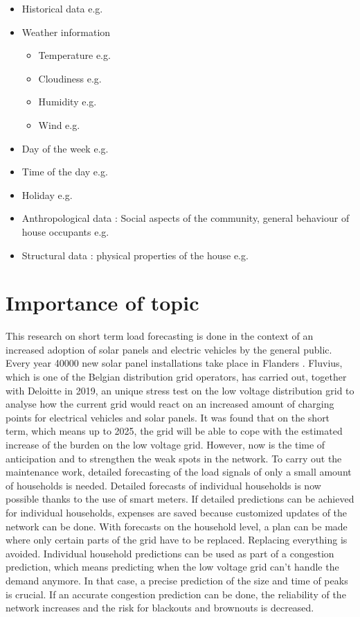 \begin{itemize}
	\item Historical data e.g. \cite{Kong2019}
	\item Weather information
	\begin{itemize}
		\item Temperature e.g. \cite{Kong2019}
		\item Cloudiness e.g. \cite{Contaxi2006}
		\item Humidity e.g. \cite{Contaxi2006}
		\item Wind e.g. \cite{Charytoniuk1997}
	\end{itemize}
	\item Day of the week e.g. \cite{Kong2019}
	\item Time of the day e.g. \cite{Kong2019}
	\item Holiday e.g. \cite{Kong2019}
	\item Anthropological data : Social aspects of the community, general behaviour of house
	occupants e.g. \cite{Javed2012}
	\item Structural data : physical properties of the house e.g. \cite{Javed2012}
\end{itemize}

\section{Importance of topic}
This research on short term load forecasting is done in the context of an increased adoption of solar panels and electric vehicles by the general public. Every year 40000 new solar panel installations take place in Flanders \cite{Lemmens2019}. Fluvius, which is one of the Belgian distribution grid operators, has carried out, together with Deloitte in 2019, an unique stress test on the low voltage distribution grid to analyse how the current grid would react on an increased amount of charging points for electrical vehicles and solar panels. It was found that on the short term, which means up to 2025, the grid will be able to cope with the estimated increase of the burden on the low voltage grid. However, now is the time of anticipation and to strengthen the weak spots in the network. To carry out the maintenance work, detailed forecasting of the load signals of only a small amount of households is needed. Detailed forecasts of individual households is now possible thanks to the use of smart meters. If detailed predictions can be achieved for individual households, expenses are saved because customized updates of the network can be done. With forecasts on the household level, a plan can be made where only certain parts of the grid have to be replaced. Replacing everything is avoided. Individual household predictions can be used as part of a congestion prediction, which means predicting when the low voltage grid can't handle the demand anymore. In that case, a precise prediction of the size and time of peaks is crucial. If an accurate congestion prediction can be done, the reliability of the network increases and the risk for blackouts and brownouts is decreased.\\

